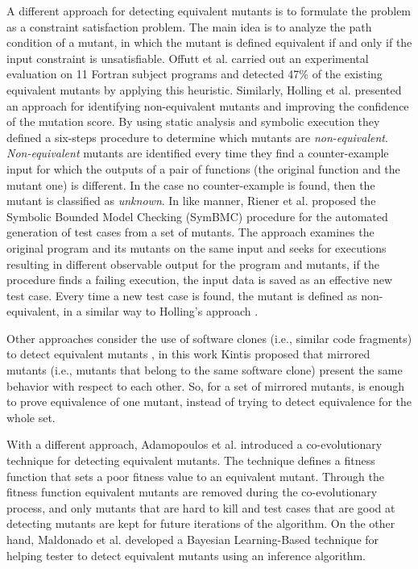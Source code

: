 A different approach for detecting equivalent mutants is to formulate the problem as a constraint satisfaction problem. The main idea is to analyze the path condition of a mutant, in which the mutant is defined equivalent if and only if the input constraint is unsatisfiable. Offutt et al. \cite{offutt1996detecting,offutt1997automatically} carried out an experimental evaluation on 11 Fortran subject programs and detected 47\% of the existing equivalent mutants by applying this heuristic.
Similarly, Holling et al. \cite{holling2016nequivack,papadakis2012mutation} presented an approach for identifying non-equivalent mutants and improving the confidence of the mutation score. By using static analysis and symbolic execution they defined a six-steps procedure to determine which mutants are \textit{non-equivalent}. \textit{Non-equivalent} mutants are identified every time they find a counter-example input for which the outputs of a pair of functions (the original function and the mutant one) is different. In the case no counter-example is found, then the mutant is classified as \textit{unknown}. 
In like manner, Riener et al. \cite{riener2011test} proposed the Symbolic Bounded Model Checking (SymBMC) procedure for the automated generation of test cases from a set of mutants. The approach examines the original program and its mutants on the same input and seeks for executions resulting in different observable output for the program and mutants, if the procedure finds a failing execution, the input data is saved as an effective new test case. Every time a new test case is found, the mutant is defined as non-equivalent, in a similar way to Holling's approach \cite{holling2016nequivack}.

Other approaches consider the use of software clones (i.e., similar code fragments) to detect equivalent mutants \cite{kintis2013identifying}, in this work Kintis proposed that mirrored mutants (i.e., mutants that belong to the same software clone) present the same behavior with respect to each other. So, for a set of mirrored mutants, is enough to prove equivalence of one mutant, instead of trying to detect equivalence for the whole set.

With a different approach, Adamopoulos et al. \cite{adamopoulos2004overcome} introduced a co-evolutionary technique for detecting equivalent mutants. The technique defines a fitness function that sets a poor fitness value to an equivalent mutant. Through the fitness function equivalent mutants are removed during the co-evolutionary process, and only mutants that are hard to kill and test cases that are good at detecting mutants are kept for future iterations of the algorithm. On the other hand, Maldonado et al. \cite{maldonado2005bayesian} developed a Bayesian Learning-Based technique for helping tester to detect equivalent mutants using an inference algorithm.

